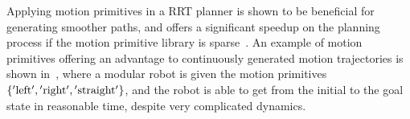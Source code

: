 Applying motion primitives in a \ac{RRT} planner is shown to be beneficial for
generating smoother paths, and offers a significant speedup on the planning
process if the motion primitive library is
sparse~\cite{vonasekGlobalMotionPlanning2013}. An example of motion primitives
offering an advantage to continuously generated motion trajectories is shown
in~\cite{vonasekHighlevelMotionPlanning2015}, where a modular robot is given the
motion primitives \(\lbrace\mathrm{'left'}, \mathrm{'right'},
  \mathrm{'straight'}\rbrace\), and the robot is able to get from the initial to the
goal state in reasonable time, despite very complicated dynamics.
